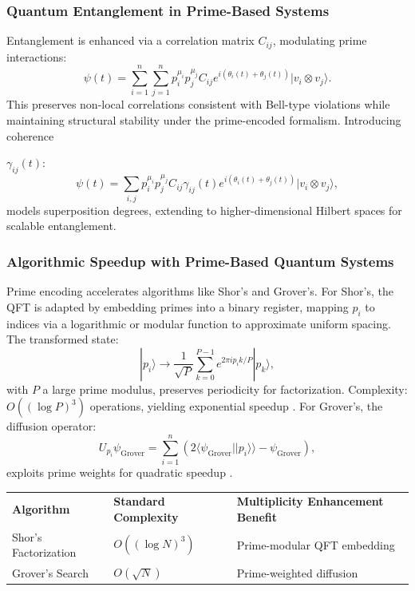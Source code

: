 \documentclass{article}
\theoremstyle{plain}
\begin{document}
\begin{enumerate}
\subsubsection{Quantum Entanglement in Prime-Based Systems}
Entanglement is enhanced via a correlation matrix $C_{ij}$, modulating prime interactions:
\begin{equation}
\psi(t) = \sum_{i=1}^{n} \sum_{j=1}^{n} p_i^{\mu_i} p_j^{\mu_j} C_{ij} e^{i (\theta_i(t) + \theta_j(t))} |v_i \otimes v_j\rangle.
\end{equation}
This preserves non-local correlations consistent with Bell-type violations \cite{bell2022}\cite{CHSH1969} while maintaining structural stability under the prime-encoded formalism.
Introducing coherence 

$\gamma_{ij}(t)$:
\begin{equation}\psi(t) = \sum_{i,j} p_i^{\mu_i} p_j^{\mu_j} C_{ij} \gamma_{ij}(t) e^{i (\theta_i(t) + \theta_j(t))} |v_i \otimes v_j\rangle,
\end{equation}
models superposition degrees, extending to higher-dimensional Hilbert spaces for scalable entanglement.

\subsubsection{Algorithmic Speedup with Prime-Based Quantum Systems}
Prime encoding accelerates algorithms like Shor's and Grover's. For Shor's, the QFT is adapted by embedding primes into a binary register, mapping $p_i$ to indices via a logarithmic or modular function to approximate uniform spacing. The transformed state:
\begin{equation}
|p_i\rangle \to \frac{1}{\sqrt{P}} \sum_{k=0}^{P-1} e^{2\pi i p_i k / P} |p_k\rangle,
\end{equation}
with $P$ a large prime modulus, preserves periodicity for factorization. Complexity: $O((\log P)^3)$ operations, yielding exponential speedup \cite{shor1997}.
For Grover's, the diffusion operator:
$$U_{p_i} \psi_{\text{Grover}} = \sum_{i=1}^{n} (2 \langle \psi_{\text{Grover}} | |p_i\rangle \rangle - \psi_{\text{Grover}}),$$
exploits prime weights for quadratic speedup \cite{grover1996}.

\begin{center}
\begin{tabular}{lll}
\textbf{Algorithm} & \textbf{Standard Complexity} & \textbf{Multiplicity Enhancement Benefit} \\
Shor's Factorization & $O((\log N)^3)$ & Prime-modular QFT embedding \\
Grover's Search & $O(\sqrt{N})$ & Prime-weighted diffusion \\
\end{tabular}
\end{center}


\end{enumerate}
\end{document}
